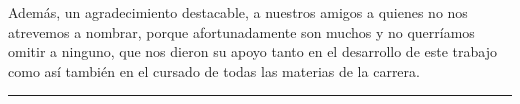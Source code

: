\documentclass[a4paper,11pt]{ThesisStyle}
\begin{document}
Además, un agradecimiento destacable, a nuestros amigos a quienes no nos atrevemos a nombrar, porque afortunadamente son muchos y no querríamos omitir a ninguno, que nos dieron su apoyo tanto en el desarrollo de este trabajo como así también en el cursado de todas las materias de la carrera. 
\noindent\rule[2pt]{\textwidth}{0.5pt}


\cleardoublepage

\tableofcontents


\mainmatter


\appendix
\addappheadtotoc
\appendixpage


\listoffigures
\listoftables
\listofalgorithms
{}

% 
% 



\end{document}
